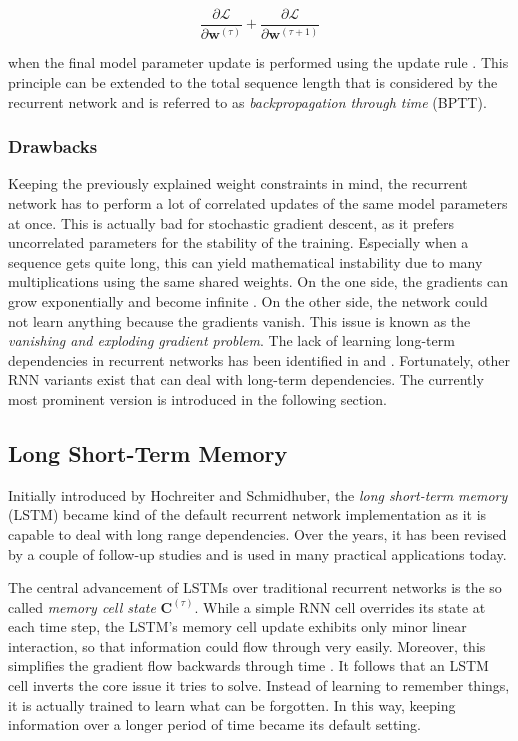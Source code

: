 \begin{equation} \label{eq:bptt}
	\frac{\partial \mathcal{L}}{\partial \textbf{w}^{(\tau)}} + \frac{\partial \mathcal{L}}{\partial \textbf{w}^{(\tau+1)}}
\end{equation}

when the final model parameter update is performed using the update rule \parencite{rnn-bptt}. This principle can be extended to the total sequence length that is considered by the recurrent network and is referred to as \textit{backpropagation through time} (BPTT).

\subsubsection{Drawbacks} \label{sec:rnn-drawbacks}

Keeping the previously explained weight constraints in mind, the recurrent network has to perform a lot of correlated updates of the same model parameters at once. This is actually bad for stochastic gradient descent, as it prefers uncorrelated parameters for the stability of the training. Especially when a sequence gets quite long, this can yield mathematical instability due to many multiplications using the same shared weights. On the one side, the gradients can grow exponentially and become infinite \parencite{lstm}. On the other side, the network could not learn anything because the gradients vanish. This issue is known as the \textit{vanishing and exploding gradient problem}. The lack of learning long-term dependencies in recurrent networks has been identified in \parencite{hochreiter} and \parencite{rnn-vanish}. Fortunately, other RNN variants exist that can deal with long-term dependencies. The currently most prominent version is introduced in the following section.


\subsection{Long Short-Term Memory}

Initially introduced by Hochreiter and Schmidhuber, the \textit{long short-term memory} (LSTM) became kind of the default recurrent network implementation as it is capable to deal with long range dependencies. Over the years, it has been revised by a couple of follow-up studies \parencite{lstm_peep} \parencite{lstm_v2} and is used in many practical applications today.

The central advancement of LSTMs over traditional recurrent networks is the so called \textit{memory cell state} $\textbf{C}^{(\tau)}$. While a simple RNN cell overrides its state at each time step, the LSTM's memory cell update exhibits only minor linear interaction, so that information could flow through very easily. Moreover, this simplifies the gradient flow backwards through time \parencite{rnn-batchnorm}. It follows that an LSTM cell inverts the core issue it tries to solve. Instead of learning to remember things, it is actually trained to learn what can be forgotten. In this way, keeping information over a longer period of time became its default setting.

